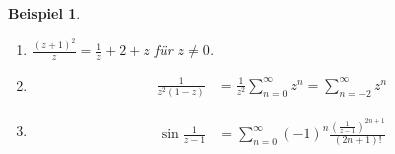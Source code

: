 \documentclass[11pt, a4paper]{article}
\theoremstyle{plain}
\newtheorem{beispiel}[blockelement]{Beispiel}
\numberwithin{equation}{subsection}
\newcommand{\pair}[1]{\left(#1\right)}
\newcommand{\theoremescape}{\leavevmode}
\begin{document}
    \begin{beispiel}
        \theoremescape
        \begin{enumerate}
            \item $\frac{\pair{z+1}^2}{z} = \frac{1}{z} + 2 + z$ für $z\neq 0$.
            \item
            \begin{align*}
                \frac{1}{z^2\pair{1-z}} &= \frac{1}{z^2} \sum_{n=0}^{\infty} z^n = \sum_{n=-2}^{\infty} z^n
            \end{align*}
            \item
            \begin{align*}
                \sin \frac{1}{z-1} &= \sum_{n=0}^{\infty} \pair{-1}^{n} \frac{\pair{\frac{1}{z-1}}^{2n+1}}{(2n+1)!}
            \end{align*}
        \end{enumerate}
    \end{beispiel}
\end{document}
